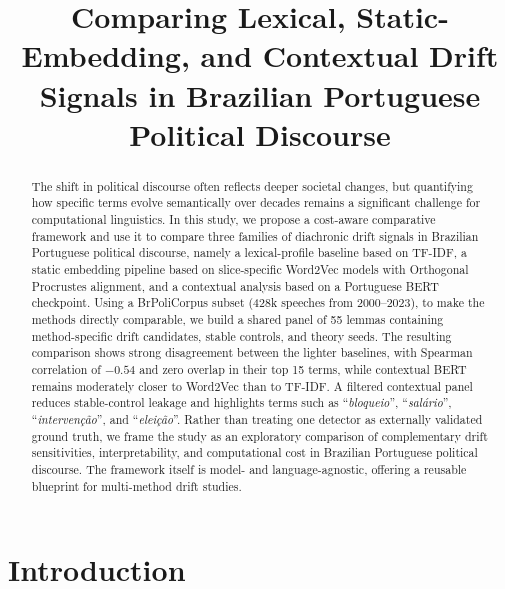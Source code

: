 \documentclass[12pt]{article}
\title{Comparing Lexical, Static-Embedding, and Contextual Drift Signals in Brazilian Portuguese Political Discourse}
\author{}
\begin{document}
\maketitle

\begin{abstract}
The shift in political discourse often reflects deeper societal changes, but quantifying how specific terms evolve semantically over decades remains a significant challenge for computational linguistics. In this study, we propose a cost-aware comparative framework and use it to compare three families of diachronic drift signals in Brazilian Portuguese
political discourse, namely a lexical-profile baseline based on TF-IDF, a static
embedding pipeline based on slice-specific Word2Vec models with Orthogonal
Procrustes alignment, and a contextual analysis based on a Portuguese BERT
checkpoint.
Using a BrPoliCorpus subset (428k speeches from 2000--2023), to make the methods directly comparable, we build a shared panel of 55 lemmas containing method-specific drift candidates, stable controls, and theory seeds.
The resulting comparison shows strong disagreement between the
lighter baselines, with Spearman correlation of $-0.54$ and zero overlap in their
top 15 terms, while contextual BERT remains moderately closer to Word2Vec than
to TF-IDF. A filtered contextual panel reduces stable-control leakage and
highlights terms such as ``\textit{bloqueio}'', ``\textit{sal\'ario}'',
``\textit{interven\c{c}\~ao}'', and ``\textit{elei\c{c}\~ao}''. Rather than treating
one detector as externally validated ground truth, we frame the study as an
exploratory comparison of complementary drift sensitivities, interpretability,
and computational cost in Brazilian Portuguese political discourse. The framework itself is model- and language-agnostic, offering a reusable blueprint for multi-method drift studies.
\end{abstract}

\section{Introduction}
\label{sec:introduction}
\end{document}
